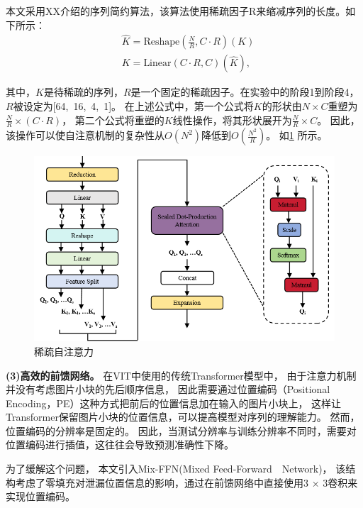 本文采用XX介绍的序列简约算法，该算法使用稀疏因子R来缩减序列的长度。如下所示：
\begin{equation}
	\begin{aligned}
		&{\hat{K}} = {\text{Reshape}(\frac{N}{R},C \cdot R)(K)}\\
		&{K} = {\text{Linear}(C \cdot R, C)({\hat{K}}),}
	\end{aligned}
	\label{eqn:reduce}
\end{equation}

其中，$K$是待稀疏的序列，$R$是一个固定的稀疏因子。在实验中的阶段1到阶段4，$R$被设定为[64,~16,~4,~1]。
在上述公式中，第一个公式将$K$的形状由$N \times C$重塑为$\frac{N}{R}\times (C \cdot R)$，
第二个公式将重塑的$K$线性操作，将其形状展开为$\frac{N}{R} \times C$。
因此，该操作可以使自注意机制的复杂性从$O(N^2)$降低到$O(\frac{N^2}{R})$。
如\ref{图：稀疏自注意力} 所示。
\begin{figure}[h]
	\centering
	\includegraphics[width=\textwidth]{figures/稀疏自注意力.png}
	\caption{稀疏自注意力}
	\label{图：稀疏自注意力}
\end{figure}






\textbf{(3)高效的前馈网络。}
在VIT中使用的传统Transformer模型中，
由于注意力机制并没有考虑图片小块的先后顺序信息，
因此需要通过位置编码（Positional Encoding，PE）这种方式把前后的位置信息加在输入的图片小块上，
这样让Transformer保留图片小块的位置信息，可以提高模型对序列的理解能力。
然而，位置编码的分辨率是固定的。
因此，当测试分辨率与训练分辨率不同时，需要对位置编码进行插值，这往往会导致预测准确性下降。


为了缓解这个问题，
本文引入Mix-FFN(Mixed Feed-Forward　Network)，
该结构考虑了零填充对泄漏位置信息的影响，通过在前馈网络中直接使用3 × 3卷积来实现位置编码。

